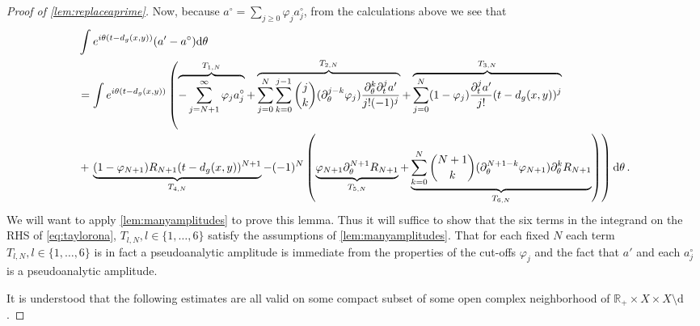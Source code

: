 \documentclass[
	fontsize=11pt, 
	twoside=false, 
	abstract=true, 
	a4paper,
]{scrartcl}
\newcommand{\RR}{\mathbb{R}}
\newcommand{\dd}{\mathrm{d}}
\newcommand{\del}{\partial}
\begin{document}
\begin{proof}[Proof of \cref{lem:replaceaprime}]
	Now, because $a^{\circ} = \sum_{j\geq 0}\varphi_j a_j^{\circ}$, from the calculations above we see that
	\begin{align}
		&\int e^{i\theta(t-d_g(x,y))}(a'-a^{\circ})\dd\theta \label{eq:taylorona}\\
		&= \int e^{i\theta(t-d_g(x,y))} \left(\overbrace{-\sum_{j=N+1}^\infty \varphi_ja_j^{\circ}}^{T_{1,N}}+\overbrace{\sum_{j=0}^N \sum_{k=0}^{j-1} {j\choose k}(\del_\theta^{j-k} \varphi_j)\frac{\del_\theta^k\del_t^j a'}{j!(-1)^j}}^{T_{2,N}} + \overbrace{\sum_{j=0}^N(1-\varphi_j)\frac{\del_t^j a'}{j!}(t-d_g(x,y))^j}^{T_{3,N}}\right.\notag\\
		&+\left. \underbrace{(1-\varphi_{N+1})R_{N+1}(t-d_g(x,y))^{N+1}}_{T_{4,N}}-(-1)^{N}\left(\underbrace{\varphi_{N+1}\del_\theta^{N+1}R_{N+1}}_{T_{5,N}}+\underbrace{\sum_{k=0}^{N} {N+1\choose k}(\del_\theta^{N+1-k}\varphi_{N+1})\del_\theta^{k}R_{N+1}}_{T_{6,N}}\right)\right)\dd\theta\,.\notag
	\end{align}
		We will want to apply \cref{lem:manyamplitudes} to prove this lemma. Thus it will suffice to show that the six terms in the integrand on the RHS of \cref{eq:taylorona}, $T_{l,N}, l\in\{1,\dots,6\}$ satisfy the assumptions of \cref{lem:manyamplitudes}. That for each fixed $N$ each term $T_{l,N}, l\in\{1,\dots,6\}$ is in fact a pseudoanalytic amplitude is immediate from the properties of the cut-offs $\varphi_j$ and the fact that $a'$ and each $a^{\circ}_j$ is a pseudoanalytic amplitude.

		It is understood that the following estimates are all valid on some compact subset of some open complex neighborhood of $\RR_+\times X\times X\setminus\mathrm{d}$.


\end{proof}
\end{document}

